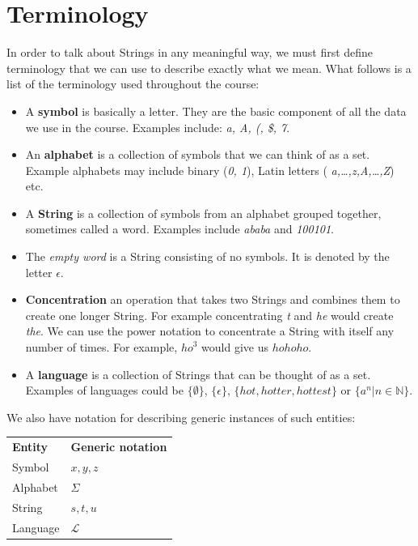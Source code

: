 
\section{Terminology}

In order to talk about Strings in any meaningful way, we must first define
terminology that we can use to describe exactly what we mean. What follows is a
list of the terminology used throughout the course:

\begin{itemize}
	\item A {\bf symbol} is basically a letter. They are the basic component of
	all the data we use in the course. Examples include: {\it a, A, (, \$, 7}.
	\item An {\bf alphabet} is a collection of symbols that we can think of as a
	set. Example alphabets may include binary ({\it 0, 1}), Latin letters ({\it
	a,\dots,z,A,\dots,Z}) etc.
	\item A {\bf String} is a collection of symbols from an alphabet grouped
	together, sometimes	called a word. Examples include {\it ababa} and
	{\it 100101}.
	\item The {\it empty word} is a String consisting of no symbols. It is
	denoted by the letter $\epsilon$.
	\item {\bf Concentration} an operation that takes two Strings and combines
	them to create one longer String. For example concentrating {\it t} and {\it
	he} would create {\it the}. We can use the power notation to concentrate a
	String with itself any number of times. For example, ${ho}^3$ would give us
	$hohoho$.
	\item A {\bf language} is a collection of Strings that can be thought of as
	a set. Examples of languages could be $\{\emptyset\}$, $\{\epsilon\}$,
	$\{hot,hotter,hottest\}$ or $\{a^n | n \in \mathbb{N}\}$.
\end{itemize}

We also have notation for describing generic instances of such entities:

\begin{center}
	\begin{tabular}{l l}
		{\bf Entity} & {\bf Generic notation}\\
		Symbol & $x, y, z$\\
		Alphabet & $\Sigma$\\
		String & $s, t, u$\\
		Language & $\mathcal{L}$\\
	\end{tabular}
\end{center}

